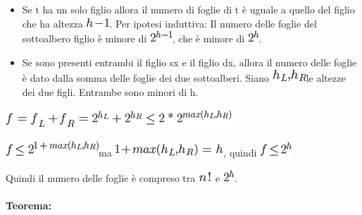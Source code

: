 \documentclass{article}
\providecommand{\tightlist}{%
  \setlength{\itemsep}{0pt}\setlength{\parskip}{0pt}}
\let\oldparagraph\paragraph
\renewcommand{\paragraph}[1]{\oldparagraph{#1}\mbox{}}
\begin{document}
\begin{itemize}
\tightlist
\item
  {Se t ha un solo figlio allora il numero di foglie di t è uguale a
  quello del figlio che ha altezza
  }\includegraphics{images/image166.png}{. }{Per ipotesi induttiva}{: Il
  numero delle foglie del sottoalbero figlio è minore di
  }\includegraphics{images/image167.png}{, che è minore di
  }\includegraphics{images/image161.png}{.}
\item
  {Se sono presenti entrambi il figlio sx e il figlio dx, allora il
  numero delle foglie è dato dalla somma delle foglie dei due
  sottoalberi. Siano }\includegraphics{images/image168.png}{le altezze
  dei due figli. Entrambe sono minori di h.}
\end{itemize}

\includegraphics{images/image169.png}

\includegraphics{images/image170.png}{ma
}\includegraphics{images/image171.png}{, quindi
}\includegraphics{images/image172.png}

{Quindi il numero delle foglie è compreso tra
}\includegraphics{images/image160.png}{~e
}\includegraphics{images/image161.png}{.}



\hypertarget{h.hr66c3ikhdcj}{\paragraph{\texorpdfstring{{Teorema:}}{Teorema:}}\label{h.hr66c3ikhdcj}}
\end{document}
